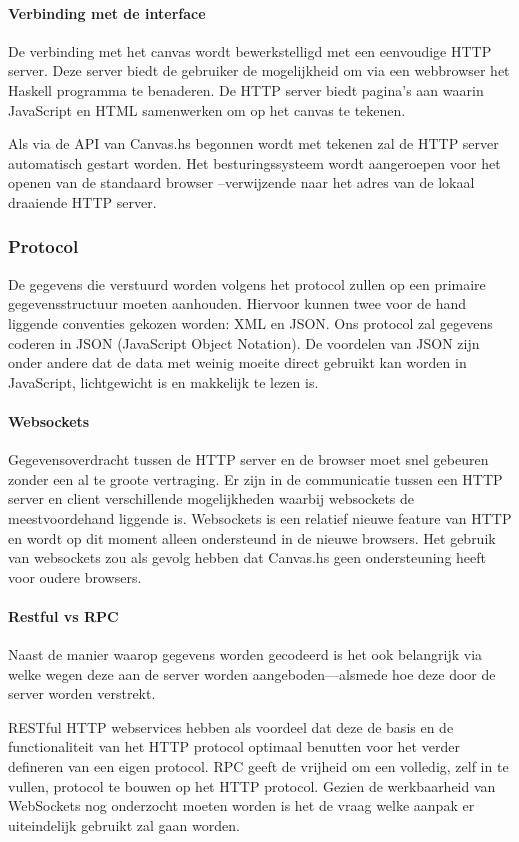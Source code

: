 \paragraph{Verbinding met de interface}
De verbinding met het canvas wordt bewerkstelligd met een eenvoudige HTTP server. Deze server biedt de gebruiker de mogelijkheid om via een webbrowser het Haskell programma te benaderen. De HTTP server biedt pagina's aan waarin JavaScript en HTML samenwerken om op het canvas te tekenen.

Als via de API van Canvas.hs begonnen wordt met tekenen zal de HTTP server automatisch gestart worden. Het besturingssysteem wordt aangeroepen voor het openen van de standaard browser --verwijzende naar het adres van de lokaal draaiende HTTP server.
\subsubsection{Protocol}
De gegevens die verstuurd worden volgens het protocol zullen op een primaire gegevensstructuur moeten aanhouden. Hiervoor kunnen twee voor de hand liggende conventies gekozen worden: XML en JSON. Ons protocol zal gegevens coderen in JSON (JavaScript Object Notation). De voordelen van JSON zijn onder andere dat de data met weinig moeite direct gebruikt kan worden in JavaScript, lichtgewicht is en makkelijk te lezen is.
\paragraph{Websockets}
Gegevensoverdracht tussen de HTTP server en de browser moet snel gebeuren zonder een al te groote vertraging. Er zijn in de communicatie tussen een HTTP server en client verschillende mogelijkheden waarbij websockets de meestvoordehand liggende is. Websockets is een relatief nieuwe feature van HTTP en wordt op dit moment alleen ondersteund in de nieuwe browsers. Het gebruik van websockets zou als gevolg hebben dat Canvas.hs geen ondersteuning heeft voor oudere browsers.
\paragraph{Restful vs RPC}
Naast de manier waarop gegevens worden gecodeerd is het ook belangrijk via welke wegen deze aan de server worden aangeboden—alsmede hoe deze door de server worden verstrekt.

RESTful HTTP webservices hebben als voordeel dat deze de basis en de functionaliteit van het HTTP protocol optimaal benutten voor het verder defineren van een eigen protocol. RPC geeft de vrijheid om een volledig, zelf in te vullen, protocol te bouwen op het HTTP protocol. Gezien de werkbaarheid van WebSockets nog onderzocht moeten worden is het de vraag welke aanpak er uiteindelijk gebruikt zal gaan worden.

